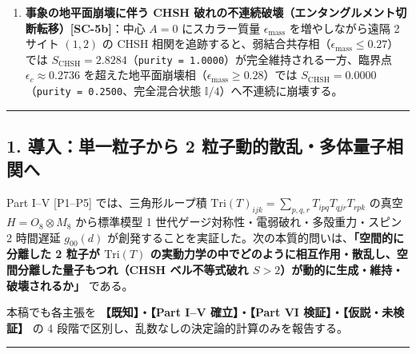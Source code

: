 \documentclass[
  a4paper,
]{ltjsarticle}
\begin{document}
\begin{enumerate}
  最大値および具体的 4
  測定ベクトル直接評価の双方で一致）を自発達成する。さらに初期に積状態
  \(|\uparrow_1\uparrow_2\rangle\) を投入して
  \(S_{\mathrm{CHSH}}(0) = 2.1462\)（\(S_E = 0.2912\text{ bit}\)）へ低下させても、\(\mathrm{Tri}(T)\)
  動力学が \(\tau = 1 \to 3 \to 40\) で
  \textbf{\(S_{\mathrm{CHSH}} = 2.6973 \to 2.8259 \to 2.8117\)}（\(S_E = 0.9834\text{ bit}\)）へ動的に引き戻す（動的エンタングルメント生成・自己修復アトラクタ）。
\item
  \textbf{事象の地平面崩壊に伴う CHSH
  破れの不連続破壊（エンタングルメント切断転移）{[}SC-5b{]}}：中心
  \(A=0\) にスカラー質量 \(\epsilon_{\mathrm{mass}}\) を増やしながら遠隔
  2 サイト \((1,2)\) の CHSH
  相関を追跡すると、弱結合共存相（\(\epsilon_{\mathrm{mass}} \le 0.27\)）では
  \(S_{\mathrm{CHSH}} = \mathbf{2.8284}\)（\texttt{purity\ =\ 1.0000}）が完全維持される一方、臨界点
  \(\epsilon_c \approx 0.2736\)
  を超えた地平面崩壊相（\(\epsilon_{\mathrm{mass}} \ge 0.28\)）では
  \textbf{\(S_{\mathrm{CHSH}} = \mathbf{0.0000}\)}（\texttt{purity\ =\ 0.2500}、完全混合状態
  \(\mathbb{I}/4\)）へ不連続に崩壊する。
\end{enumerate}

\begin{center}\rule{0.5\linewidth}{0.5pt}\end{center}

\subsection{1. 導入：単一粒子から 2
粒子動的散乱・多体量子相関へ}\label{ux5c0eux5165ux5358ux4e00ux7c92ux5b50ux304bux3089-2-ux7c92ux5b50ux52d5ux7684ux6563ux4e71ux591aux4f53ux91cfux5b50ux76f8ux95a2ux3078}

Part I--V {[}P1--P5{]} では、三角形ループ積
\(\mathrm{Tri}(T)_{ijk} = \sum_{p,q,r} T_{ipq} T_{qjr} T_{rpk}\) の真空
\(H = O_8 \otimes M_8\) から標準模型 1
世代ゲージ対称性・電弱破れ・多殻重力・スピン 2 時間遅延 \(g_{00}(d)\)
が創発することを実証した。次の本質的問いは、\textbf{「空間的に分離した 2
粒子が \(\mathrm{Tri}(T)\)
の実動力学の中でどのように相互作用・散乱し、空間分離した量子もつれ（CHSH
ベル不等式破れ \(S > 2\)）が動的に生成・維持・破壊されるか」} である。

本稿でも各主張を \textbf{【既知】・【Part I--V 確立】・【Part VI
検証】・【仮説・未検証】} の 4
段階で区別し、乱数なしの決定論的計算のみを報告する。

\begin{center}\rule{0.5\linewidth}{0.5pt}\end{center}
\end{document}
